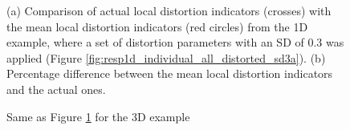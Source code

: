 \begin{figure}[!t]
	\centering
	\caption[Comparison of the actual and the mean local distortion indicators and percentage difference]{(a) Comparison of actual local distortion indicators (crosses) with the mean local distortion indicators (red circles) from the 1D example, where a set of distortion parameters with an SD of 0.3 was applied (Figure \ref{fig:resp1d_individual_all_distorted_sd3a}). (b) Percentage difference between the mean local distortion indicators and the actual ones.}
	\label{fig:gamma_1d_site}
\end{figure}
\begin{figure}[t]
	\centering
	\caption{Same as Figure \ref{fig:gamma_1d_site} for the 3D example}
	\label{fig:gamma_3d_site}
\end{figure}



